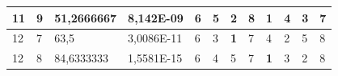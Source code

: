 \documentclass[conference]{IEEEtran}
\begin{document}
\begin{table}[]
\begin{tabular}{|llll|llllllll|}
\multicolumn{1}{|l|}{11}                                                    & \multicolumn{1}{l|}{9}                                                        & \multicolumn{1}{l|}{51,2666667}                                                   & 8,142E-09                      & \multicolumn{1}{l|}{6}                                                  & \multicolumn{1}{l|}{5}                                                  & \multicolumn{1}{l|}{2}                                                  & \multicolumn{1}{l|}{8}                                                  & \multicolumn{1}{l|}{\textbf{1}}                                         & \multicolumn{1}{l|}{4}                                                  & \multicolumn{1}{l|}{3}                                                  & 7                          \\ \hline
\multicolumn{1}{|l|}{12}                                                    & \multicolumn{1}{l|}{7}                                                        & \multicolumn{1}{l|}{63,5}                                                         & 3,0086E-11                     & \multicolumn{1}{l|}{6}                                                  & \multicolumn{1}{l|}{3}                                                  & \multicolumn{1}{l|}{\textbf{1}}                                         & \multicolumn{1}{l|}{7}                                                  & \multicolumn{1}{l|}{4}                                                  & \multicolumn{1}{l|}{2}                                                  & \multicolumn{1}{l|}{5}                                                  & 8                          \\ \hline
\multicolumn{1}{|l|}{12}                                                    & \multicolumn{1}{l|}{8}                                                        & \multicolumn{1}{l|}{84,6333333}                                                   & 1,5581E-15                     & \multicolumn{1}{l|}{6}                                                  & \multicolumn{1}{l|}{4}                                                  & \multicolumn{1}{l|}{5}                                                  & \multicolumn{1}{l|}{7}                                                  & \multicolumn{1}{l|}{\textbf{1}}                                         & \multicolumn{1}{l|}{3}                                                  & \multicolumn{1}{l|}{2}                                                  & 8                          \\ \hline

\end{tabular}
\end{table}
\end{document}
